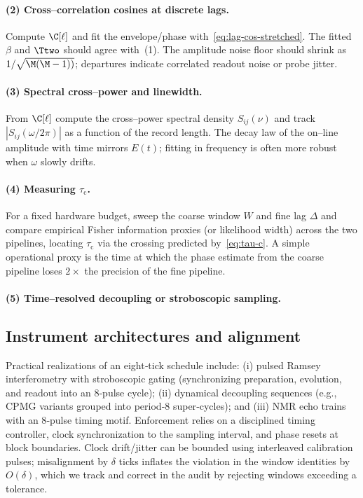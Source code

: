 \documentclass[12pt,a4paper]{article}
\theoremstyle{definition}
\theoremstyle{remark}
\begin{document}
\paragraph{(2) Cross--correlation cosines at discrete lags.}
Compute \(\C[\ell]\) and fit the envelope/phase with~\eqref{eq:lag-cos-stretched}. The fitted \(\beta\) and \(\Ttwo\) should agree with~(1). The amplitude noise floor should shrink as \(1/\sqrt{\M(\M-1))}\); departures indicate correlated readout noise or probe jitter.

\paragraph{(3) Spectral cross--power and linewidth.}
From \(\C[\ell]\) compute the cross--power spectral density \(S_{ij}(\nu)\) and track \(|S_{ij}(\omega/2\pi)|\) as a function of the record length. The decay law of the on--line amplitude with time mirrors \(E(t)\); fitting in frequency is often more robust when \(\omega\) slowly drifts.

\paragraph{(4) Measuring \(\tau_{\mathrm{c}}\).}
For a fixed hardware budget, sweep the coarse window \(W\) and fine lag \(\Delta\) and compare empirical Fisher information proxies (or likelihood width) across the two pipelines, locating \(\tau_{\mathrm{c}}\) via the crossing predicted by~\eqref{eq:tau-c}. A simple operational proxy is the time at which the phase estimate from the coarse pipeline loses \(2\times\) the precision of the fine pipeline.

\paragraph{(5) Time--resolved decoupling or stroboscopic sampling.}
\subsection{Instrument architectures and alignment}
Practical realizations of an eight‑tick schedule include: (i) pulsed Ramsey interferometry with stroboscopic gating (synchronizing preparation, evolution, and readout into an 8‑pulse cycle); (ii) dynamical decoupling sequences (e.g., CPMG variants grouped into period‑8 super‑cycles); and (iii) NMR echo trains with an 8‑pulse timing motif. Enforcement relies on a disciplined timing controller, clock synchronization to the sampling interval, and phase resets at block boundaries. Clock drift/jitter can be bounded using interleaved calibration pulses; misalignment by \(\delta\) ticks inflates the violation in the window identities by \(O(\delta)\), which we track and correct in the audit by rejecting windows exceeding a tolerance.
\end{document}
